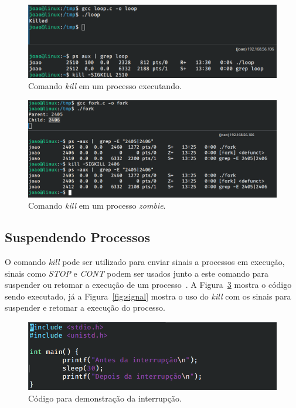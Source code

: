 \documentclass[
	12pt,				%
	oneside,   	        %
	a4paper,			%
	english,			%
	french,				%
	spanish,			%
	brazil,				%
	]{pacotes/abntex2}
\begin{document}
\begin{figure}[H]
  \centering
  \includegraphics[scale=0.45]{figuras/kill.png}
  \caption{Comando \textit{kill} em um processo executando.}
  \label{fig:kill}
\end{figure}

\begin{figure}[H]
  \centering
  \includegraphics[scale=0.45]{figuras/zombie.png}
  \caption{Comando \textit{kill} em um processo \textit{zombie}.}
  \label{fig:zombie}
\end{figure}

\subsection{Suspendendo Processos}
\label{subsec:suspendendo}

O comando \textit{kill} pode ser utilizado para enviar sinais a processos em execução, sinais como \textit{STOP} e \textit{CONT} podem ser usados junto a este comando para suspender ou retomar a execução de um processo~\cite{guiafoca}. A Figura~\ref{fig:interrupt} mostra o código sendo executado, já a  Figura~\ref{fig:signal} mostra o uso do \textit{kill} com os sinais para suspender e retomar a execução do processo.

\begin{figure}[H]
  \centering
  \includegraphics[scale=0.45]{figuras/interrupt.png}
  \caption{Código para demonstração da interrupção.}
  \label{fig:interrupt}
\end{figure}
\end{document}
